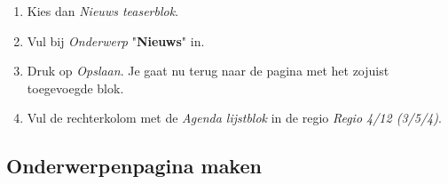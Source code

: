 \begin{enumerate}
\begin{center}
\end{center}
\item Kies dan \emph{Nieuws teaserblok}.
\begin{center}
\end{center}
\item Vul bij \emph{Onderwerp} "\textbf{Nieuws}" in.
\item Druk op \emph{Opslaan}. Je gaat nu terug naar de pagina met het zojuist toegevoegde blok.
\item Vul de rechterkolom met de \emph{Agenda lijstblok} in de regio \emph{Regio 4/12 (3/5/4)}.
\end{enumerate}

\subsection{Onderwerpenpagina maken}

